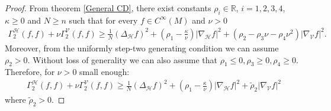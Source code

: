 \documentclass[11pt]{article}
\numberwithin{equation}{section}
\newcommand{\Ho}{\mathcal H}
\newcommand{\V}{\mathcal V}
\begin{document}
\begin{proof}
From theorem \ref{General CD}, there exist constants $\rho_i \in \mathbb{R}$, $i=1,2,3,4$,  $\kappa \ge 0$ and $N \ge n$ such that for every $f \in C^\infty (M)$ and $\nu>0$
\begin{align*}
\Gamma^\Ho_2 (f,f)+ \nu \Gamma_2^\V (f,f) \ge \frac{1}{N}(\Delta_\Ho f)^2 +\left(\rho_1-\frac{\kappa}{\nu} \right) | \nabla_\Ho f|^2+ (\rho_2 -\rho_3 \nu -\rho_4 \nu^2) | \nabla_\V f|^2.
\end{align*}
Moreover, from the uniformly step-two generating condition we can assume $\rho_2 >0$.  Without loss of generality we can also assume that $\rho_1 \le 0, \rho_3 \ge 0, \rho_4 \ge 0$. Therefore, for $\nu>0$ small enough:
\begin{align}\label{CD local}
\Gamma^\Ho_2 (f,f)+ \nu \Gamma_2^\V (f,f) \ge \frac{1}{N}(\Delta_\Ho f)^2 +\left(\rho_1-\frac{\kappa}{\nu} \right) | \nabla_\Ho f|^2+ \tilde{\rho}_2 | \nabla_\V f|^2
\end{align}
where $\tilde{\rho}_2>0$.



\end{proof}
\end{document}
